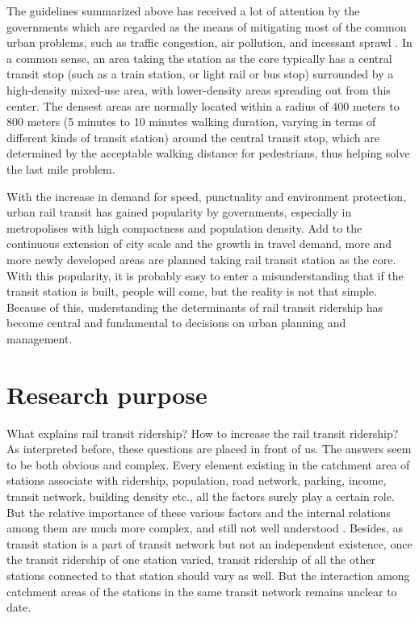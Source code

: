 The guidelines summarized above has received a lot of attention by the governments which are regarded as the means of mitigating most of the common urban problems, such as traffic congestion, air pollution, and incessant sprawl \cite{cervero2002transit}. In a common sense, an area taking the station as the core typically has a central transit stop (such as a train station, or light rail or bus stop) surrounded by a high-density mixed-use area, with lower-density areas spreading out from this center. The densest areas are normally located within a radius of 400 meters to 800 meters (5 minutes to 10 minutes walking duration, varying in terms of different kinds of transit station) around the central transit stop, which are determined by the acceptable walking distance for pedestrians, thus helping solve the last mile problem.

With the increase in demand for speed, punctuality and environment protection, urban rail transit has gained popularity by governments, especially in metropolises with high compactness and population density. Add to the continuous extension of city scale and the growth in travel demand, more and more newly developed areas are planned taking rail transit station as the core. With this popularity, it is probably easy to enter a misunderstanding that if the transit station is built, people will come, but the reality is not that simple. Because of this, understanding the determinants of rail transit ridership has become central and fundamental to decisions on urban planning and management. 

% 
\section{Research purpose}
What explains rail transit ridership? How to increase the rail transit ridership? As interpreted before, these questions are placed in front of us. The answers seem to be both obvious and complex. Every element existing in the catchment area of stations associate with ridership, population, road network, parking, income, transit network, building density etc., all the factors surely play a certain role. But the relative importance of these various factors and the internal relations among them are much more complex, and still not well understood \cite{taylor2003factors}. Besides, as transit station is a part of transit network but not an independent existence, once the transit ridership of one station varied, transit ridership of all the other stations connected to that station should vary as well. But the interaction among catchment areas of the stations in the same transit network remains unclear to date.

